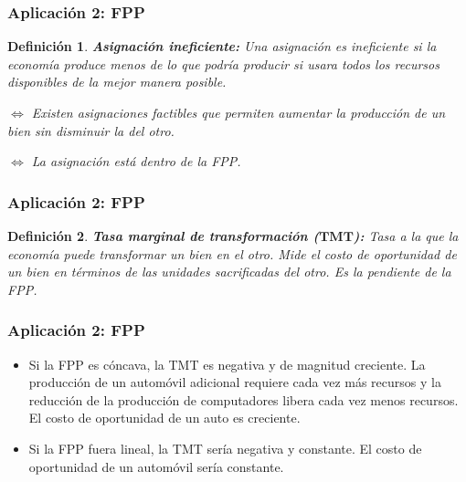 \documentclass[dvipsnames,table]{beamer}
\newtheorem{mydef}{Definición}
\begin{document}
		\begin{frame}
			\frametitle{Aplicación 2: FPP}
			\begin{mydef}
				\textbf{Asignación ineficiente:} Una asignación es ineficiente si la economía produce menos de lo que podría producir si usara todos los recursos disponibles de la mejor manera posible.
				
				\vspace{.5cm}
				$\iff$ Existen asignaciones factibles que permiten aumentar la producción de un bien sin disminuir la del otro.
				
				\vspace{.5cm}
				$\iff$ La asignación está dentro de la FPP.
			\end{mydef}
		\end{frame}	

		\begin{frame}
			\frametitle{Aplicación 2: FPP}
			\begin{mydef}
				\textbf{Tasa marginal de transformación ($\mathbf{TMT}$):} Tasa a la que la economía puede transformar un bien en el otro. Mide el costo de oportunidad de un bien en términos de las unidades sacrificadas del otro. Es la pendiente de la FPP.
			\end{mydef}
		\end{frame}

		\begin{frame}
			\frametitle{Aplicación 2: FPP}
				\begin{itemize}
					\item Si la FPP es cóncava, la TMT es negativa y de magnitud creciente. La producción de un automóvil adicional requiere cada vez más recursos y la reducción de la producción de computadores libera cada vez menos recursos. El costo de oportunidad de un auto es creciente.
					\item Si la FPP fuera lineal, la TMT sería negativa y constante. El costo de oportunidad de un automóvil sería constante.
				\end{itemize}
		\end{frame}
\end{document}
